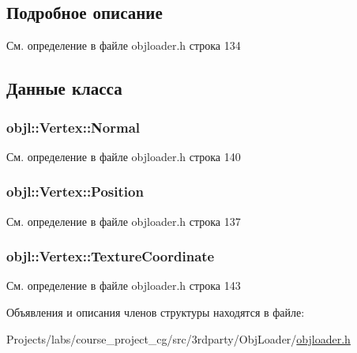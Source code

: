 \subsection{Подробное описание}


См. определение в файле objloader.\+h строка 134



\subsection{Данные класса}
\subsubsection[{\texorpdfstring{Normal}{Normal}}]{ objl\+::\+Vertex\+::\+Normal}\hypertarget{structobjl_1_1_vertex_a0a5918e142a939241edeec52944b9edf}{}\label{structobjl_1_1_vertex_a0a5918e142a939241edeec52944b9edf}


См. определение в файле objloader.\+h строка 140

\subsubsection[{\texorpdfstring{Position}{Position}}]{ objl\+::\+Vertex\+::\+Position}\hypertarget{structobjl_1_1_vertex_a08acd50ed3a3a8b7b0b6ca0b78b61c13}{}\label{structobjl_1_1_vertex_a08acd50ed3a3a8b7b0b6ca0b78b61c13}


См. определение в файле objloader.\+h строка 137

\subsubsection[{\texorpdfstring{Texture\+Coordinate}{TextureCoordinate}}]{ objl\+::\+Vertex\+::\+Texture\+Coordinate}\hypertarget{structobjl_1_1_vertex_af05b2c1ef5f35a15c8ada3e2cd99a9b1}{}\label{structobjl_1_1_vertex_af05b2c1ef5f35a15c8ada3e2cd99a9b1}


См. определение в файле objloader.\+h строка 143



Объявления и описания членов структуры находятся в файле\+:\begin{DoxyCompactItemize}
\item 
Projects/labs/course\+\_\+project\+\_\+cg/src/3rdparty/\+Obj\+Loader/\hyperlink{3rdparty_2_obj_loader_2objloader_8h}{objloader.\+h}\end{DoxyCompactItemize}
